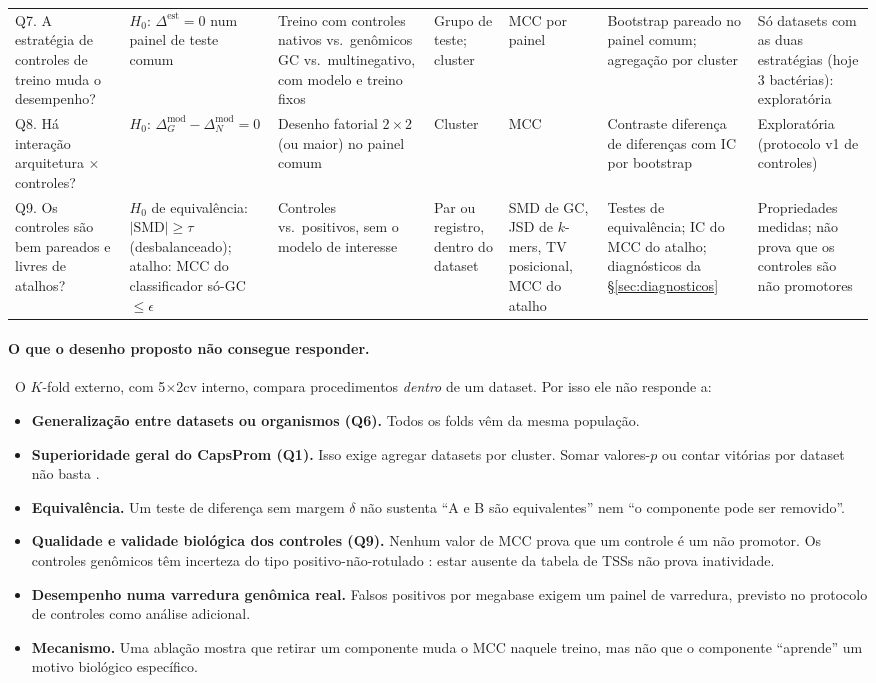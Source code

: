 \documentclass[11pt,a4paper]{article}
\newcommand{\etiqueta}[2]{\tcbox[on line, colback=#1!10, colframe=#1!75!black,
  boxrule=0.4pt, arc=1.2pt, left=1.5pt, right=1.5pt, top=0pt, bottom=0pt,
  fontupper=\sffamily\scriptsize\bfseries]{#2}}
\newcommand{\rec}{\etiqueta{oiVerm}{Recomendação}}
\begin{document}
\begin{landscape}
{\begin{tabularx}{\linewidth}{L{2.6cm}L{3.6cm}YL{2.1cm}L{1.5cm}L{3.6cm}L{3.0cm}}
Q7. A estratégia de controles de treino muda o desempenho? & $H_0$: $\Delta^{\text{est}}=0$ num painel de teste comum & Treino com controles nativos vs.\ genômicos GC vs.\ multinegativo, com modelo e treino fixos & Grupo de teste; cluster & MCC por painel & Bootstrap pareado no painel comum; agregação por cluster & Só datasets com as duas estratégias (hoje 3 bactérias): exploratória \\
Q8. Há interação arquitetura $\times$ controles? & $H_0$: $\Delta^{\text{mod}}_G-\Delta^{\text{mod}}_N=0$ & Desenho fatorial $2\times2$ (ou maior) no painel comum & Cluster & MCC & Contraste diferença de diferenças com IC por bootstrap & Exploratória (protocolo v1 de controles) \\
Q9. Os controles são bem pareados e livres de atalhos? & $H_0$ de equivalência: $|\text{SMD}|\geq\tau$ (desbalanceado); atalho: MCC do classificador só-GC $\leq\epsilon$ & Controles vs.\ positivos, sem o modelo de interesse & Par ou registro, dentro do dataset & SMD de GC, JSD de $k$-mers, TV posicional, MCC do atalho & Testes de equivalência; IC do MCC do atalho; diagnósticos da \S\ref{sec:diagnosticos} & Propriedades medidas; não prova que os controles são não promotores \\
\bottomrule
\end{tabularx}
}
\end{landscape}

\paragraph{O que o desenho proposto não consegue responder.} \rec\ O $K$-fold externo, com 5$\times$2cv interno, compara procedimentos \emph{dentro} de um dataset. Por isso ele não responde a:
\begin{itemize}[leftmargin=1.4em]
\item \textbf{Generalização entre datasets ou organismos (Q6).} Todos os folds vêm da mesma população.
\item \textbf{Superioridade geral do CapsProm (Q1).} Isso exige agregar datasets por cluster. Somar valores-$p$ ou contar vitórias por dataset não basta \citep{demsar2006}.
\item \textbf{Equivalência.} Um teste de diferença sem margem $\delta$ não sustenta ``A e B são equivalentes'' nem ``o componente pode ser removido''.
\item \textbf{Qualidade e validade biológica dos controles (Q9).} Nenhum valor de MCC prova que um controle é um não promotor. Os controles genômicos têm incerteza do tipo positivo-não-rotulado \citep{elkan2008}: estar ausente da tabela de TSSs não prova inatividade.
\item \textbf{Desempenho numa varredura genômica real.} Falsos positivos por megabase exigem um painel de varredura, previsto no protocolo de controles como análise adicional.
\item \textbf{Mecanismo.} Uma ablação mostra que retirar um componente muda o MCC naquele treino, mas não que o componente ``aprende'' um motivo biológico específico.
\end{itemize}
\end{document}
